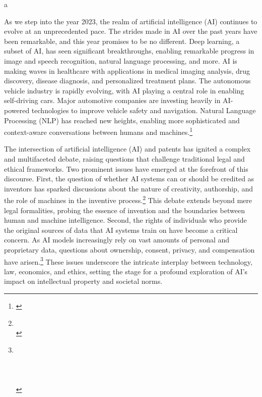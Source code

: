 a\documentclass{article}[10pt]
\begin{document}
As we step into the year 2023, the realm of artificial intelligence (AI) continues to evolve at an unprecedented pace. 
The strides made in AI over the past years have been remarkable, and this year promises to be no different. 
Deep learning, a subset of AI, has seen significant breakthroughs, enabling remarkable progress in image and speech recognition, natural language processing, and more. 
AI is making waves in healthcare with applications in medical imaging analysis, drug discovery, disease diagnosis, and personalized treatment plans. 
The autonomous vehicle industry is rapidly evolving, with AI playing a central role in enabling self-driving cars. 
Major automotive companies are investing heavily in AI-powered technologies to improve vehicle safety and navigation. 
Natural Language Processing (NLP) has reached new heights, enabling more sophisticated and context-aware conversations between humans and machines.\footnote{
    \cite{identicalCloud}} \par


The intersection of artificial intelligence (AI) and patents has ignited a complex and multifaceted debate, raising questions that challenge traditional legal and ethical frameworks. 
Two prominent issues have emerged at the forefront of this discourse. 
First, the question of whether AI systems can or should be credited as inventors has sparked discussions about the nature of creativity, authorship, and the role of machines in the inventive process.\footnote{
    \cite{ramalho2018patentability}\\
    \indent\indent \cite{yanisky2017artificial}} 
This debate extends beyond mere legal formalities, probing the essence of invention and the boundaries between human and machine intelligence. 
Second, the rights of individuals who provide the original sources of data that AI systems train on have become a critical concern. 
As AI models increasingly rely on vast amounts of personal and proprietary data, questions about ownership, consent, privacy, and compensation have arisen.\footnote{
    \cite{pasquale2015black}\\
    \indent\indent \cite{zarsky2013transparent}\\
    \indent\indent \cite{taylor2016group}\\
    \indent\indent \cite{mittelstadt2016ethics}\\
    \indent\indent \cite{wachter2017right}}
These issues underscore the intricate interplay between technology, law, economics, and ethics, setting the stage for a profound exploration of AI's impact on intellectual property and societal norms.\par
\end{document}
